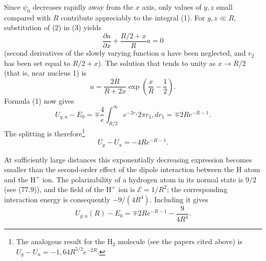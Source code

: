 Since $\psi_0$ decreases rapidly away from the $x$ axis, only values of $y,z$ small compared with $R$ contribute appreciably to the integral (1). For $y,z\ll R$, substitution of (2) in (3) yields
\[\frac{\partial a}{\partial x}+\frac{R/2+x}{R}a=0\]
(second derivatives of the slowly varying function $a$ have been neglected, and $r_2$ has been set equal to $R/2+x$). The solution that tends to unity as $x\to R/2$ (that is, near nucleus 1) is
\[a=\frac{2R}{R+2x}\exp\left(\frac{x}{R}-\frac12\right).\]
Formula (1) now gives
\[U_{g,u}-E_0=\mp\frac4e\int_{R/2}^{\infty}e^{-2r_1}2\pi r_1,dr_1=\mp2Re^{-R-1}.\]
The splitting is therefore\footnote{The analogous result for the $\mathrm H_2$ molecule (see the papers cited above) is $U_g-U_u=-1{,}64R^{5/2}e^{-2R}$.}
\begin{equation}U_g-U_u=-4Re^{-R-1}.\tag{4}\end{equation}

At sufficiently large distances this exponentially decreasing expression becomes smaller than the second-order effect of the dipole interaction between the H atom and the $\mathrm H^+$ ion. The polarizability of a hydrogen atom in its normal state is $9/2$ (see (77.9)), and the field of the $\mathrm H^+$ ion is $\mathcal E=1/R^2$; the corresponding interaction energy is consequently $-9/(4R^4)$. Including it gives
\begin{equation}U_{g,u}(R)-E_0=\mp2Re^{-R-1}-\frac9{4R^4}.\tag{5}\end{equation}

